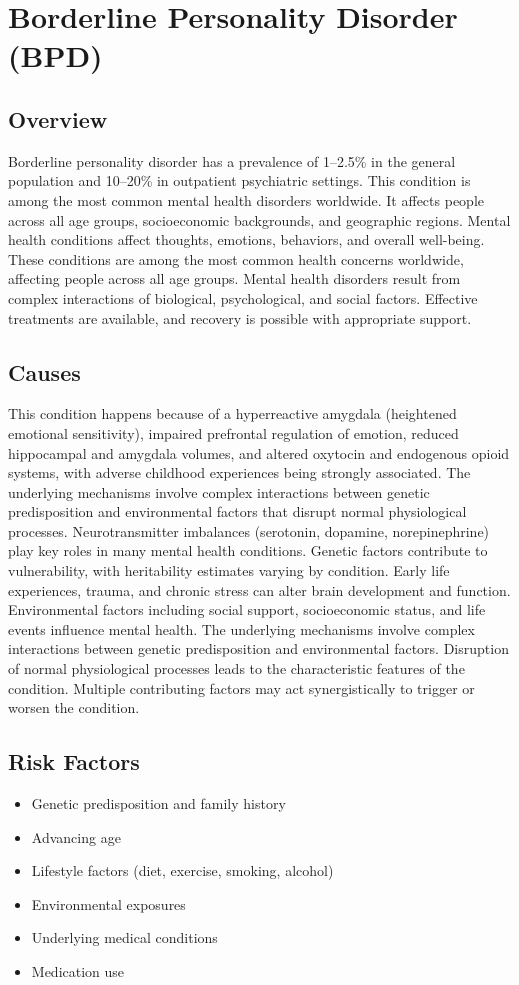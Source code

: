 \chapter{Borderline Personality Disorder (BPD)}
\label{sec:Borderline Personality Disorder (BPD)}

\section{Overview}
Borderline personality disorder has a prevalence of 1--2.5\% in the general population and 10--20\% in outpatient psychiatric settings. This condition is among the most common mental health disorders worldwide. It affects people across all age groups, socioeconomic backgrounds, and geographic regions. Mental health conditions affect thoughts, emotions, behaviors, and overall well-being. These conditions are among the most common health concerns worldwide, affecting people across all age groups. Mental health disorders result from complex interactions of biological, psychological, and social factors. Effective treatments are available, and recovery is possible with appropriate support.
\section{Causes}
This condition happens because of a hyperreactive amygdala (heightened emotional sensitivity), impaired prefrontal regulation of emotion, reduced hippocampal and amygdala volumes, and altered oxytocin and endogenous opioid systems, with adverse childhood experiences being strongly associated. The underlying mechanisms involve complex interactions between genetic predisposition and environmental factors that disrupt normal physiological processes. Neurotransmitter imbalances (serotonin, dopamine, norepinephrine) play key roles in many mental health conditions. Genetic factors contribute to vulnerability, with heritability estimates varying by condition. Early life experiences, trauma, and chronic stress can alter brain development and function. Environmental factors including social support, socioeconomic status, and life events influence mental health. The underlying mechanisms involve complex interactions between genetic predisposition and environmental factors. Disruption of normal physiological processes leads to the characteristic features of the condition. Multiple contributing factors may act synergistically to trigger or worsen the condition.
\section{Risk Factors}
\begin{itemize}[noitemsep]
  \item Genetic predisposition and family history
  \item Advancing age
  \item Lifestyle factors (diet, exercise, smoking, alcohol)
  \item Environmental exposures
  \item Underlying medical conditions
  \item Medication use
\end{itemize}
